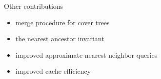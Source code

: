 \begin{frame}{Other contributions}
\begin{itemize}
\item merge procedure for cover trees
\item the nearest ancestor invariant 
\item improved approximate nearest neighbor queries
\item improved cache efficiency
\end{itemize}
\end{frame}
